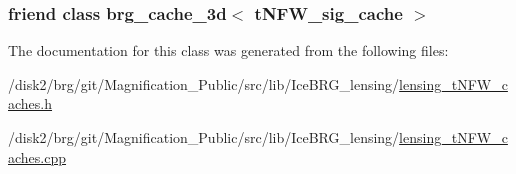 \subsubsection[{brg\+\_\+cache\+\_\+3d$<$ t\+N\+F\+W\+\_\+sig\+\_\+cache $>$}]{\setlength{\rightskip}{0pt plus 5cm}friend class {\bf brg\+\_\+cache\+\_\+3d}$<$ {\bf t\+N\+F\+W\+\_\+sig\+\_\+cache} $>$\hspace{0.3cm}{\ttfamily [friend]}}\label{classIceBRG_1_1tNFW__sig__cache_ab708b180518c4a67afb01c6910438b1b}


The documentation for this class was generated from the following files\+:\begin{DoxyCompactItemize}
\item 
/disk2/brg/git/\+Magnification\+\_\+\+Public/src/lib/\+Ice\+B\+R\+G\+\_\+lensing/\hyperlink{lensing__tNFW__caches_8h}{lensing\+\_\+t\+N\+F\+W\+\_\+caches.\+h}\item 
/disk2/brg/git/\+Magnification\+\_\+\+Public/src/lib/\+Ice\+B\+R\+G\+\_\+lensing/\hyperlink{lensing__tNFW__caches_8cpp}{lensing\+\_\+t\+N\+F\+W\+\_\+caches.\+cpp}\end{DoxyCompactItemize}
